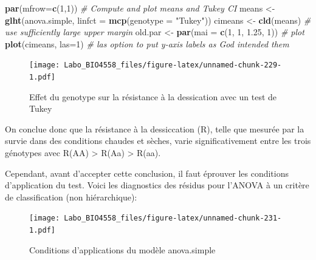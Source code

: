 \documentclass[12pt,]{book}
\newenvironment{Shaded}{\begin{snugshade}}{\end{snugshade}}
\newcommand{\CommentTok}[1]{\textcolor[rgb]{0.37,0.37,0.37}{\textit{#1}}}
\newcommand{\DataTypeTok}[1]{\textcolor[rgb]{0.27,0.27,0.27}{#1}}
\newcommand{\DecValTok}[1]{\textcolor[rgb]{0.06,0.06,0.06}{#1}}
\newcommand{\FloatTok}[1]{\textcolor[rgb]{0.06,0.06,0.06}{#1}}
\newcommand{\KeywordTok}[1]{\textcolor[rgb]{0.27,0.27,0.27}{\textbf{#1}}}
\newcommand{\NormalTok}[1]{#1}
\newcommand{\StringTok}[1]{\textcolor[rgb]{0.5,0.5,0.5}{#1}}
\begin{document}
\begin{Shaded}
\begin{Highlighting}[]
\KeywordTok{par}\NormalTok{(}\DataTypeTok{mfrow=}\KeywordTok{c}\NormalTok{(}\DecValTok{1}\NormalTok{,}\DecValTok{1}\NormalTok{))}
\CommentTok{# Compute and plot means and Tukey CI}
\NormalTok{means <-}\StringTok{ }\KeywordTok{glht}\NormalTok{(anova.simple, }\DataTypeTok{linfct =} \KeywordTok{mcp}\NormalTok{(}\DataTypeTok{genotype =}
  \StringTok{"Tukey"}\NormalTok{))}
\NormalTok{cimeans <-}\StringTok{ }\KeywordTok{cld}\NormalTok{(means)}
\CommentTok{# use sufficiently large upper margin}
\NormalTok{old.par <-}\StringTok{ }\KeywordTok{par}\NormalTok{(}\DataTypeTok{mai =} \KeywordTok{c}\NormalTok{(}\DecValTok{1}\NormalTok{, }\DecValTok{1}\NormalTok{, }\FloatTok{1.25}\NormalTok{, }\DecValTok{1}\NormalTok{))}
\CommentTok{# plot}
\KeywordTok{plot}\NormalTok{(cimeans, }\DataTypeTok{las=}\DecValTok{1}\NormalTok{) }\CommentTok{# las option to put y-axis labels as God intended them}
\end{Highlighting}
\end{Shaded}

\begin{figure}
\centering
\texttt{[image: Labo\_BIO4558\_files/figure-latex/unnamed-chunk-229-1.pdf]}
\caption{\label{fig:unnamed-chunk-229}Effet du genotype sur la résistance à la dessication avec un test de Tukey}
\end{figure}

On conclue donc que la résistance à la dessiccation (R), telle que mesurée par la survie dans des conditions chaudes et sèches, varie significativement entre les trois génotypes avec R(AA) \textgreater{} R(Aa) \textgreater{} R(aa).

Cependant, avant d'accepter cette conclusion, il faut éprouver les conditions d'application du test. Voici les diagnostics des résidus pour l'ANOVA à un critère de classification (non hiérarchique):

\begin{figure}
\centering
\texttt{[image: Labo\_BIO4558\_files/figure-latex/unnamed-chunk-231-1.pdf]}
\caption{\label{fig:unnamed-chunk-231}Conditions d'applications du modèle anova.simple}
\end{figure}
\end{document}
